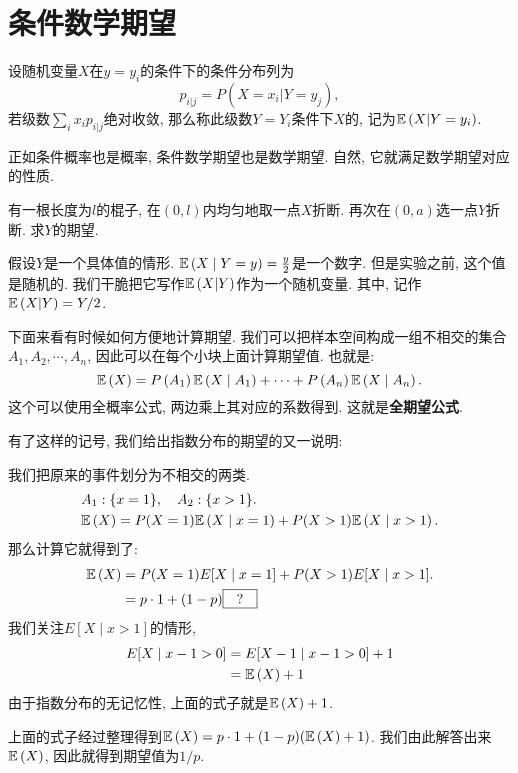\section{条件数学期望}



    \begin{definition}
        设随机变量$X$在$y=y_i$的条件下的条件分布列为
        $$
        p_{i|j}=P(X=x_i | Y=y_j),
        $$
        若级数$\sum_i x_i p_{i|j}$绝对收敛, 那么称此级数$Y=Y_i$条件下$X$的, 记为$\mathbb E\left(X|Y=y_i\right)$.
    \end{definition}

    正如条件概率也是概率, 条件数学期望也是数学期望. 自然, 它就满足数学期望对应的性质. 

    \begin{example}
        有一根长度为$l$的棍子, 在$(0,l)$内均匀地取一点$X$折断. 再次在$(0,a)$选一点$Y$折断. 求$Y$的期望. 
    \end{example}

    \begin{solution}
        假设$Y$是一个具体值的情形. $\mathbb E\left(X \mid Y=y\right)=\frac{y}{2}$是一个数字. 但是实验之前, 这个值是随机的. 我们干脆把它写作$\mathbb E\left(X|Y\right)$作为一个随机变量. 其中, 记作$\mathbb E\left(X|Y\right)=Y/2$.
    \end{solution}



    下面来看有时候如何方便地计算期望. 我们可以把样本空间构成一组不相交的集合$A_1, A_2, \cdots, A_n$, 因此可以在每个小块上面计算期望值. 也就是: $$
    \mathbb E\left(X\right)=P\left(A_1\right) \mathbb E\left(X \mid A_1\right)+\cdots+P\left(A_n\right) \mathbb E\left(X \mid A_n\right) .
    $$
    这个可以使用全概率公式, 两边乘上其对应的系数得到. 这就是\textbf{全期望公式}. 


    有了这样的记号, 我们给出指数分布的期望的又一说明: 
    \begin{example}
        
    我们把原来的事件划分为不相交的两类. 
    $$
    \begin{aligned}
    & A_1:\{x=1\}, \quad A_2:\{x>1\} . \\
    & \mathbb E\left(X\right)=P(X=1) \mathbb E\left(X \mid x=1\right)+P(X>1) \mathbb E\left(X \mid x>1\right) .
    \end{aligned}
    $$
    那么计算它就得到了: 
    $$
\begin{aligned}
\mathbb E\left(X\right) & =P(X=1) E[X \mid x=1]+P(X>1) E[X \mid x>1] . \\
& =p \cdot 1+(1-p)\boxed{~~?~~}
\end{aligned}
$$
我们关注$E[X \mid x>1]$的情形, $$
\begin{aligned}
E[X \mid x-1>0] & =E[X-1 \mid x-1>0]+1 \\
& =\mathbb E\left(X\right)+1
\end{aligned}
$$
由于指数分布的无记忆性, 上面的式子就是$\mathbb E\left(X\right)+1$. 

上面的式子经过整理得到$\mathbb E\left(X\right)=p \cdot 1+(1-p)(\mathbb E\left(X\right)+1)$. 我们由此解答出来$\mathbb E\left(X\right)$, 因此就得到期望值为$1/p$. 

    \end{example}

